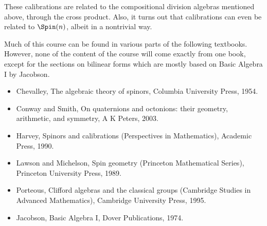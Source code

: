 These calibrations are related to the compositional division algebras mentioned above, through the cross product. Also, it turns out that calibrations can even be related to $\Spin(n)$, albeit in a nontrivial way.

Much of this course can be found in various parts of the following textbooks. However, none of the content of the course will come exactly from one book, except for the sections on bilinear forms which are mostly based on Basic Algebra I by Jacobson.
\begin{itemize}
\item \cite{Chevalley1995-fk} Chevalley, The algebraic theory of spinors, Columbia University Press, 1954. 
\item \cite{Conway2001-rn} Conway and Smith, On quaternions and octonions: their geometry, arithmetic, and symmetry, A K Peters,
2003.
\item \cite{Reese_Harvey1990-fv} Harvey, Spinors and calibrations (Perspectives in Mathematics), Academic Press, 1990.
\item \cite{Lawson1990-fd} Lawson and Michelson, Spin geometry (Princeton Mathematical Series), Princeton University Press, 1989.
\item \cite{Porteous1995-hp} Porteous, Clifford algebras and the classical groups (Cambridge Studies in Advanced Mathematics), Cambridge University Press, 1995.
\item \cite{Jacobson2009-pp} Jacobson, Basic Algebra I, Dover Publications, 1974.
\end{itemize}